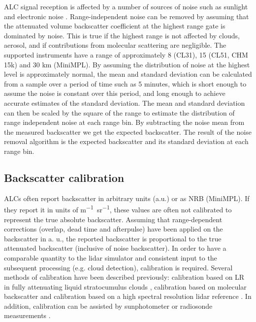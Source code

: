 ALC signal reception is affected by a number of sources of noise such
as sunlight and electronic noise \citep{kotthaus2016}. Range-independent
noise can be removed by assuming that the attenuated
volume backscatter coefficient at the highest range gate is dominated by
noise. This is true if the highest range is not affected
by clouds, aerosol, and if contributions from molecular scattering are negligible.
The supported instruments have a range of approximately 8 (CL31), 15
(CL51, CHM 15k) and 30 km (MiniMPL).
By assuming the distribution of noise at the highest level is approximately
normal, the mean and standard deviation can be calculated from a sample over a
period of time such as 5 minutes, which is short enough to assume the noise is constant
over this period, and long enough to achieve accurate estimates of the standard
deviation. The mean and standard deviation can then be scaled by the
square of the range to estimate the distribution of range independent noise at
each range bin. By subtracting the noise mean from the measured backscatter
we get the expected backscatter. The result of the noise removal algorithm
is the expected backscatter and its standard deviation at each range bin.

\subsection{Backscatter calibration}
\label{sec:backscatter-calibration}

ALCs often report backscatter in arbitrary units (a.u.) or as NRB (MiniMPL).
If they report it in units of \unit{m^{-1}sr^{-1}}, these values are often not calibrated to
represent the true absolute backscatter.
Assuming that range-dependent corrections (overlap, dead time and afterpulse)
have been applied on the backscatter in a. u., the reported backscatter is proportional
to the true attenuated backscatter (inclusive of noise backscatter).
In order to have a comparable quantity to the lidar simulator and consistent
input to the subsequent processing (e.g. cloud detection), calibration is
required.
Several methods of calibration have been described previously:
calibration based on LR in fully attenuating liquid stratocumulus
clouds \citep{oconnor2004,hopkin2019}, calibration based on molecular
backscatter \citep{wiegner2014} and calibration based on a high spectral resolution lidar
reference \citep{heese2010,jin2015}. In addition, calibration can be
assisted by sunphotometer or radiosonde measurements \citep{wiegner2014}.

